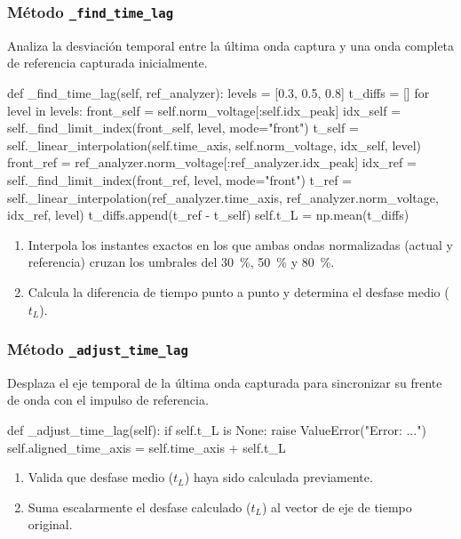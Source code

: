\subsubsection{Método \texttt{\_find\_time\_lag}}
Analiza la desviación temporal entre la última onda captura y una onda completa de referencia capturada inicialmente.

\begin{python}
def _find_time_lag(self, ref_analyzer):
    levels = [0.3, 0.5, 0.8]
    t_diffs = []
    for level in levels:
        front_self = self.norm_voltage[:self.idx_peak]
        idx_self = self._find_limit_index(front_self, level, mode="front")
        t_self = self._linear_interpolation(self.time_axis, self.norm_voltage, idx_self, level)
        front_ref = ref_analyzer.norm_voltage[:ref_analyzer.idx_peak]
        idx_ref = self._find_limit_index(front_ref, level, mode="front")
        t_ref = self._linear_interpolation(ref_analyzer.time_axis, ref_analyzer.norm_voltage, idx_ref, level)
        t_diffs.append(t_ref - t_self)
    self.t_L = np.mean(t_diffs)
\end{python}

\begin{enumerate}
    \item Interpola los instantes exactos en los que ambas ondas normalizadas (actual y referencia) cruzan los umbrales del \SI{30}{\percent}, \SI{50}{\percent} y \SI{80}{\percent}.
    \item Calcula la diferencia de tiempo punto a punto y determina el desfase medio ($t_L$).
\end{enumerate}

\subsubsection{Método \texttt{\_adjust\_time\_lag}}
Desplaza el eje temporal de la última onda capturada para sincronizar su frente de onda con el impulso de referencia.

\begin{python}
def _adjust_time_lag(self):
    if self.t_L is None:
        raise ValueError("Error: ...")
    self.aligned_time_axis = self.time_axis + self.t_L
\end{python}

\begin{enumerate}
    \item Valida que desfase medio ($t_L$) haya sido calculada previamente.
    \item Suma escalarmente el desfase calculado ($t_L$) al vector de eje de tiempo original.
\end{enumerate}

